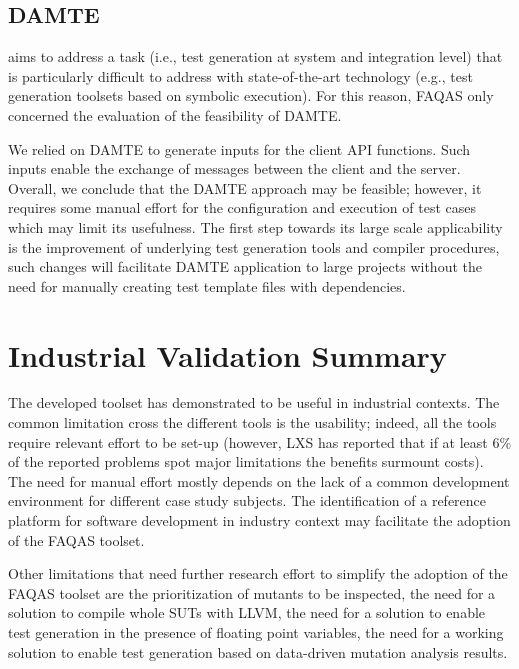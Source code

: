 \subsection{DAMTE}

\DAMTE aims to address a task (i.e., test generation at system and integration level) that is particularly difficult to address with state-of-the-art technology (e.g., test generation toolsets based on symbolic execution). 
For this reason, FAQAS only concerned the evaluation of the feasibility of DAMTE.

We relied on DAMTE to generate inputs for the \PARAM client API functions. Such inputs enable the exchange of messages between the \PARAM client and the \PARAM server. Overall, we conclude that the DAMTE approach may be feasible; however, it requires some manual effort for the configuration and execution of test cases which may limit its usefulness. The first step towards its large scale applicability is the improvement of underlying test generation tools and compiler procedures, such changes will facilitate DAMTE application to large projects without the need for manually creating test template files with dependencies.


\STARTCHANGEDWPT

\section{Industrial Validation Summary}
\label{sec:validationsum}

The developed toolset has demonstrated to be useful in industrial contexts. The common limitation cross the different tools is the usability; indeed, all the tools require relevant effort to be set-up (however, LXS has reported that if at least 6\% of the reported problems spot major limitations the benefits surmount costs). The need for manual effort mostly depends on the lack of a common development environment for different case study subjects. The identification of a reference platform for software development in industry context may facilitate the adoption of the FAQAS toolset.

Other limitations that need further research effort to simplify the adoption of the FAQAS toolset are the prioritization of mutants to be inspected, the need for a solution to compile whole SUTs with LLVM, the need for a solution to enable test generation in the presence of floating point variables, the need for a working solution to enable test generation based on data-driven mutation analysis results. 

